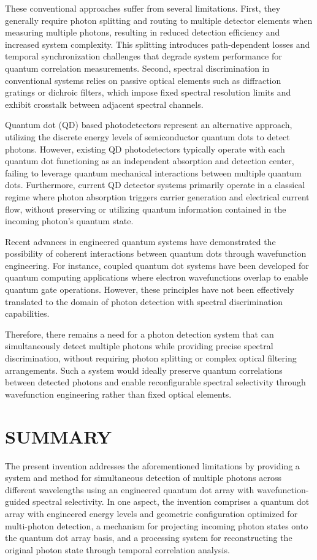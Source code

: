 \documentclass[12pt,letterpaper]{article}
\begin{document}
These conventional approaches suffer from several limitations. First, they generally require photon splitting and routing to multiple detector elements when measuring multiple photons, resulting in reduced detection efficiency and increased system complexity. This splitting introduces path-dependent losses and temporal synchronization challenges that degrade system performance for quantum correlation measurements. Second, spectral discrimination in conventional systems relies on passive optical elements such as diffraction gratings or dichroic filters, which impose fixed spectral resolution limits and exhibit crosstalk between adjacent spectral channels.

Quantum dot (QD) based photodetectors represent an alternative approach, utilizing the discrete energy levels of semiconductor quantum dots to detect photons. However, existing QD photodetectors typically operate with each quantum dot functioning as an independent absorption and detection center, failing to leverage quantum mechanical interactions between multiple quantum dots. Furthermore, current QD detector systems primarily operate in a classical regime where photon absorption triggers carrier generation and electrical current flow, without preserving or utilizing quantum information contained in the incoming photon's quantum state.

Recent advances in engineered quantum systems have demonstrated the possibility of coherent interactions between quantum dots through wavefunction engineering. For instance, coupled quantum dot systems have been developed for quantum computing applications where electron wavefunctions overlap to enable quantum gate operations. However, these principles have not been effectively translated to the domain of photon detection with spectral discrimination capabilities.

Therefore, there remains a need for a photon detection system that can simultaneously detect multiple photons while providing precise spectral discrimination, without requiring photon splitting or complex optical filtering arrangements. Such a system would ideally preserve quantum correlations between detected photons and enable reconfigurable spectral selectivity through wavefunction engineering rather than fixed optical elements.

\section*{SUMMARY}

The present invention addresses the aforementioned limitations by providing a system and method for simultaneous detection of multiple photons across different wavelengths using an engineered quantum dot array with wavefunction-guided spectral selectivity. In one aspect, the invention comprises a quantum dot array with engineered energy levels and geometric configuration optimized for multi-photon detection, a mechanism for projecting incoming photon states onto the quantum dot array basis, and a processing system for reconstructing the original photon state through temporal correlation analysis.
\end{document}
